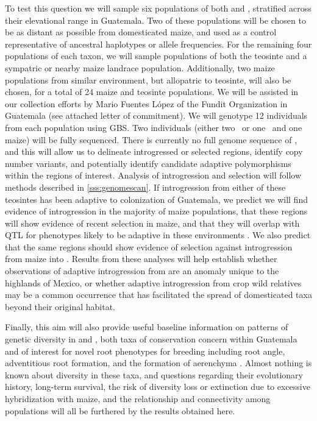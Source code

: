 To test  this question we will sample six populations of both \zl{} and \zh{}, stratified across their elevational range in Guatemala.  
Two of these populations will be chosen to be as distant as possible from domesticated maize, and used as a control representative of ancestral haplotypes or allele frequencies.  
For the remaining four populations of each taxon, we will sample populations of both the teosinte and a sympatric or nearby maize landrace population.
Additionally, two maize populations from similar environment, but allopatric to teosinte, will also be chosen, for a total of 24 maize and teosinte populations.
We will be assisted in our collection efforts by Mario Fuentes L\'{o}pez of the Fundit Organization in Guatemala (see attached letter of commitment).
We will genotype 12 individuals from each population using GBS. 
Two individuals (either two \zl\ or one \zl\ and one maize) will be fully sequenced.
There is currently no full genome sequence of \zl, and this will allow us to delineate introgressed or selected regions, identify copy number variants, and potentially identify candidate adaptive polymorphisms within the regions of interest.
Analysis of introgression and selection will follow methods described in \ref{sss:genomescan}.
If introgression from either of these teosintes has been adaptive to colonization of Guatemala, we predict we will find evidence of introgression in the majority of maize populations, that these regions will show evidence of recent selection in maize, and that they will overlap with QTL for phenotypes likely to be adaptive in these environments \citep[e.g.][]{omori2007qtl,mano2008linkage}.
We also predict that the same regions should show evidence of selection against introgression from maize into \zl.
Results from these analyses will help establish whether observations of adaptive introgression from \zm{} are an anomaly unique to the highlands of Mexico, or whether adaptive introgression from crop wild relatives may be a common occurrence that has facilitated the spread of domesticated taxa beyond their original habitat.

Finally, this aim will also provide useful baseline information on patterns of genetic diversity in \zl{} and \zh, both taxa of conservation concern within Guatemala and of interest for novel root phenotypes for breeding including root angle, adventitious root formation, and the formation of aerenchyma \citep{omori2007qtl,mano2007breeding}. 
Almost nothing is known about diversity in these taxa, and questions regarding their evolutionary history, long-term survival, the risk of diversity loss or extinction due to excessive hybridization with maize, and the relationship and connectivity among populations will all be furthered by the results obtained here.


